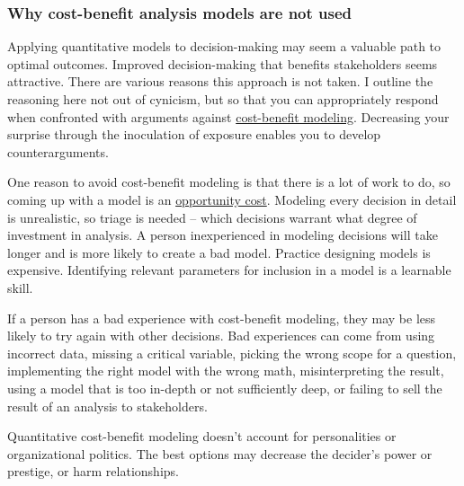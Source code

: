 \subsubsection{Why cost-benefit analysis models are not used}

Applying quantitative models to decision-making may seem a valuable path to optimal outcomes. Improved decision-making that benefits stakeholders seems attractive. There are various reasons this approach is not taken. I outline the reasoning here not out of cynicism, but so that you can appropriately respond when confronted with arguments against \href{https://en.wikipedia.org/wiki/Cost\%E2\%80\%93benefit_analysis}{cost-benefit modeling}.\iftoggle{WPinmargin}{\marginpar{[Wikipedia] cost-\\benefit modeling}}{}
Decreasing your surprise through the inoculation of exposure enables you to develop counterarguments. 

One reason to avoid cost-benefit modeling is that there is a lot of work to do, so coming up with a model is an \href{https://en.wikipedia.org/wiki/Opportunity_cost}{opportunity cost}. 
\iftoggle{WPinmargin}{\marginpar{[Wikipedia] opportunity\\cost}}{}
Modeling every decision in detail is unrealistic, so triage is needed -- which decisions warrant what degree of investment in analysis. A person inexperienced in modeling decisions will take longer and is more likely to create a bad model. Practice designing models is expensive. Identifying relevant parameters for inclusion in a model is a learnable skill. 

If a person has a bad experience with cost-benefit modeling, they may be less likely to try again with other decisions. Bad experiences can come from using incorrect data, missing a critical variable, picking the wrong scope for a question, implementing the right model with the wrong math, misinterpreting the result, using a model that is too in-depth or not sufficiently deep, or failing to sell the result of an analysis to stakeholders.

Quantitative cost-benefit modeling doesn't account for personalities or organizational politics. The best options may decrease the decider's power or prestige, or harm relationships. 

